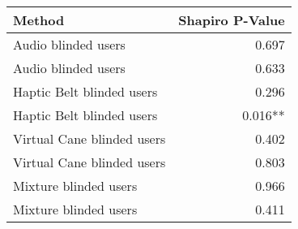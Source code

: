 
\centering
\begin{tabular}{lr}
\toprule
                    Method & Shapiro P-Value \\
\midrule
       Audio blinded users &           0.697 \\
       Audio blinded users &           0.633 \\
 Haptic Belt blinded users &           0.296 \\
 Haptic Belt blinded users &         0.016** \\
Virtual Cane blinded users &           0.402 \\
Virtual Cane blinded users &           0.803 \\
     Mixture blinded users &           0.966 \\
     Mixture blinded users &           0.411 \\
\bottomrule
\end{tabular}
